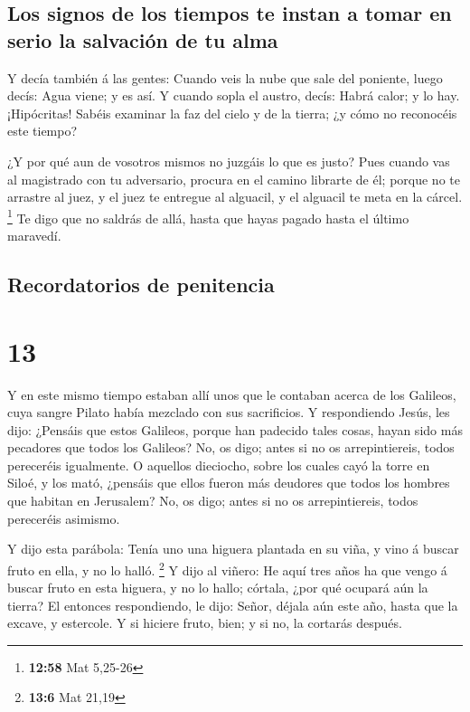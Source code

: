 \hypertarget{los-signos-de-los-tiempos-te-instan-a-tomar-en-serio-la-salvaciuxf3n-de-tu-alma}{%
\subsection{Los signos de los tiempos te instan a tomar en serio la
salvación de tu
alma}\label{los-signos-de-los-tiempos-te-instan-a-tomar-en-serio-la-salvaciuxf3n-de-tu-alma}}

 Y decía también á las gentes: Cuando veis la nube que
sale del poniente, luego decís: Agua viene; y es así.  Y
cuando sopla el austro, decís: Habrá calor; y lo hay. 
¡Hipócritas! Sabéis examinar la faz del cielo y de la tierra; ¿y cómo no
reconocéis este tiempo?

 ¿Y por qué aun de vosotros mismos no juzgáis lo que es
justo?  Pues cuando vas al magistrado con tu adversario,
procura en el camino librarte de él; porque no te arrastre al juez, y el
juez te entregue al alguacil, y el alguacil te meta en la cárcel.
\footnote{\textbf{12:58} Mat 5,25-26}  Te digo que no
saldrás de allá, hasta que hayas pagado hasta el último maravedí.

\hypertarget{recordatorios-de-penitencia}{%
\subsection{Recordatorios de
penitencia}\label{recordatorios-de-penitencia}}

\hypertarget{section-12}{%
\section{13}\label{section-12}}

 Y en este mismo tiempo estaban allí unos que le contaban
acerca de los Galileos, cuya sangre Pilato había mezclado con sus
sacrificios.  Y respondiendo Jesús, les dijo: ¿Pensáis que
estos Galileos, porque han padecido tales cosas, hayan sido más
pecadores que todos los Galileos?  No, os digo; antes si
no os arrepintiereis, todos pereceréis igualmente.  O
aquellos dieciocho, sobre los cuales cayó la torre en Siloé, y los mató,
¿pensáis que ellos fueron más deudores que todos los hombres que habitan
en Jerusalem?  No, os digo; antes si no os arrepintiereis,
todos pereceréis asimismo.

 Y dijo esta parábola: Tenía uno una higuera plantada en
su viña, y vino á buscar fruto en ella, y no lo halló. \footnote{\textbf{13:6}
  Mat 21,19}  Y dijo al viñero: He aquí tres años ha que
vengo á buscar fruto en esta higuera, y no lo hallo; córtala, ¿por qué
ocupará aún la tierra?  El entonces respondiendo, le dijo:
Señor, déjala aún este año, hasta que la excave, y estercole.
 Y si hiciere fruto, bien; y si no, la cortarás después.

